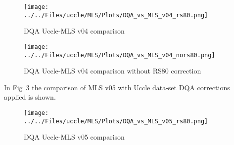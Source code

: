     \begin{figure}
        \centering
\texttt{[image: ../../Files/uccle/MLS/Plots/DQA\_vs\_MLS\_v04\_rs80.png]}
    \caption{DQA Uccle-MLS v04 comparison}
            \label{fig:mlsv4_uccle}
    \end{figure}

    \begin{figure}
        \centering
\texttt{[image: ../../Files/uccle/MLS/Plots/DQA\_vs\_MLS\_v04\_nors80.png]}
    \caption{DQA Uccle-MLS v04 comparison without RS80 correction}
            \label{fig:mlsv4_uccle_nors80}
    \end{figure}



In Fig~\ref{fig:mlsv5_uccle} the comparison of MLS v05 with Uccle data-set DQA corrections applied is shown.

    \begin{figure}
        \centering
\texttt{[image: ../../Files/uccle/MLS/Plots/DQA\_vs\_MLS\_v05\_rs80.png]}
    \caption{DQA Uccle-MLS v05 comparison}
            \label{fig:mlsv5_uccle}
    \end{figure}











